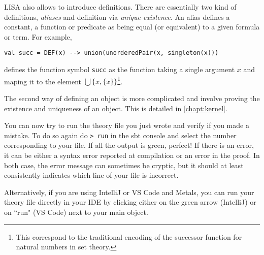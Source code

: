 LISA also allows to introduce definitions. There are essentially two kind of definitions, \emph{aliases} and definition via \emph{unique existence}.
An alias defines a constant, a function or predicate as being equal (or equivalent) to a given formula or term. For example,

\noindent\begin{minipage}{\linewidth}\vspace{1em}
  \begin{lstlisting}[language=lisa, frame=single]
  val succ = DEF(x) --> union(unorderedPair(x, singleton(x)))
  \end{lstlisting}
\end{minipage}
defines the function symbol \lstinline|succ| as the function taking a single argument $x$ and maping it to the element $\bigcup \lbrace x, \lbrace x \rbrace \rbrace$\footnote{This correspond to the traditional encoding of the successor function for natural numbers in set theory.}.

The second way of defining an object is more complicated and involve proving the existence and uniqueness of an object. This is detailed in \autoref{chapt:kernel}.

You can now try to run the theory file you just wrote and verify if you made a mistake. To do so again do \lstinline|> run| in the sbt console and select the number corresponding to your file. 
If all the output is green, perfect! If there is an error, it can be either a syntax error reported at compilation or an error in the proof. In both case, the error message can sometimes be cryptic, but it should at least consistently indicates which line of your file is incorrect.

Alternatively, if you are using IntelliJ or VS Code and Metals, you can run your theory file directly in your IDE by clicking either on the green arrow (IntelliJ) or on ``run" (VS Code) next to your main object.



